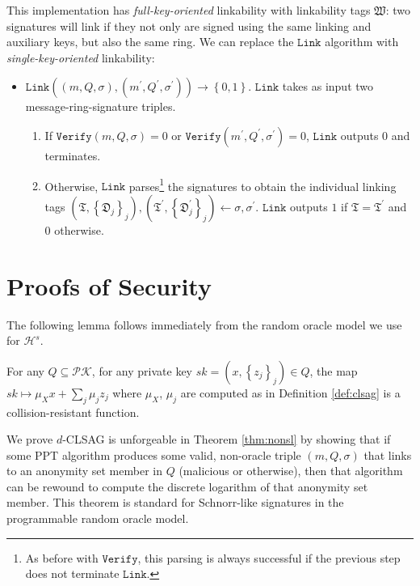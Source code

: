 \documentclass{llncs}
\newcommand{\Hs}{\mathcal{H}^s}
\begin{document}
This implementation has \textit{full-key-oriented} linkability with linkability tags $\mathfrak{W}$: two signatures will link if they not only are signed using the same linking and auxiliary keys, but also the same ring. We can replace the $\texttt{Link}$ algorithm with \textit{single-key-oriented} linkability:
\begin{itemize}

\item $\texttt{Link}\left((m, Q, \sigma), (m^\prime, Q^\prime, \sigma^\prime)\right) \to \left\{0,1\right\}$. $\texttt{Link}$ takes as input two message-ring-signature triples.
\begin{enumerate}
\item If $\texttt{Verify}(m, Q, \sigma) = 0$ or $\texttt{Verify}(m^\prime, Q^\prime, \sigma^\prime) = 0$, $\texttt{Link}$ outputs $0$ and terminates.

\item Otherwise, $\texttt{Link}$ parses\footnote{As before with $\texttt{Verify}$, this parsing is always successful if the previous step does not terminate $\texttt{Link}$.} the signatures to obtain the individual linking tags $(\mathfrak{T}, \left\{\mathfrak{D}_j\right\}_j), (\mathfrak{T}^\prime, \left\{\mathfrak{D}^\prime_j\right\}_j) \leftarrow \sigma, \sigma^\prime$. $\texttt{Link}$ outputs $1$ if $\mathfrak{T} = \mathfrak{T}^\prime$ and $0$ otherwise.
\end{enumerate}
\end{itemize}


\section{Proofs of Security}

The following lemma follows immediately from the random oracle model we use for $\Hs$.

\begin{lemma}
For any $Q \subseteq \mathcal{PK}$, for any private key $sk = (x, \left\{z_j\right\}_j) \in Q$, the map $sk \mapsto \mu_X x + \sum_j \mu_j z_j$ where $\mu_X$, $\mu_j$ are computed as in Definition \ref{def:clsag} is a collision-resistant function.
\end{lemma}

We prove $d$-CLSAG is unforgeable in Theorem \ref{thm:nonsl} by showing that if some PPT algorithm produces some valid, non-oracle triple $(m, Q, \sigma)$ that links to an anonymity set member in $Q$ (malicious or otherwise), then that algorithm can be rewound to compute the discrete logarithm of that anonymity set member. This theorem is standard for Schnorr-like signatures in the programmable random oracle model.
\end{document}
